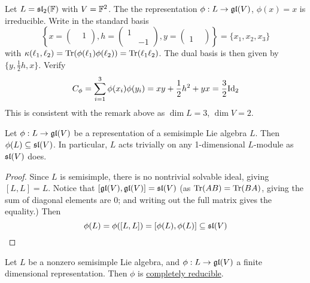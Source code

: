 \documentclass{article}
\begin{document}
\begin{example}
    Let $L = \mathfrak{sl}_2(\mathbb{F})$ with $V = \mathbb{F}^2$. The the representation $\phi: L \to \mathfrak{gl}(V)$, $\phi(x) = x$ is irreducible. Write in the standard basis
    \[
        \left\{ 
        x = \begin{pmatrix}
            & 1 \\ &     
        \end{pmatrix}, 
        h = \begin{pmatrix}
            1 & \\ & -1
        \end{pmatrix},
        y = \begin{pmatrix}
            & \\ 1 &
        \end{pmatrix}
        \right\}
         = \{ x_1, x_2, x_3 \}
    \]
    with $\kappa(\ell_1, \ell_2) = \operatorname{Tr}(\phi(\ell_1)\phi(\ell_2)) = \operatorname{Tr}(\ell_1 \ell_2)$. The dual basis is then given by $\{ y, \frac{1}{2}h, x \}$. Verify
    \[
        C_{\phi} = \sum_{i=1}^3 \phi(x_i) \phi(y_i) = xy + \frac{1}{2} h^2 + yx = \frac{3}{2} \mathrm{Id}_2
    \]
    This is consistent with the remark above as $\dim L = 3$, $\dim V = 2$.
\end{example}

\begin{lemma}\label{lem: semisimple repr acts trivially on 1-dim repr}
    Let $\phi: L \to \mathfrak{gl}(V)$ be a representation of a semisimple Lie algebra $L$. Then $\phi(L) \subseteq \mathfrak{sl}(V)$. In particular, $L$ acts trivially on any 1-dimensional $L$-module as $\mathfrak{sl}(V)$ does.
\end{lemma}

\begin{proof}
    Since $L$ is semisimple, there is no nontrivial solvable ideal, giving $[L, L] = L$. Notice that $[\mathfrak{gl}(V), \mathfrak{gl}(V)] = \mathfrak{sl}(V)$ (as $\operatorname{Tr}(AB) = \operatorname{Tr}(BA)$, giving the sum of diagonal elements are 0; and writing out the full matrix gives the equality.) Then
    \[
        \phi(L) = \phi([L, L]) = [\phi(L), \phi(L)] \subseteq \mathfrak{sl}(V)
    \]
\end{proof}

\begin{theorem}[Weyl]
    Let $L$ be a nonzero semisimple Lie algebra, and $\phi: L \to \mathfrak{gl}(V)$ a finite dimensional representation. Then $\phi$ is \hyperref[def: completely reducible]{completely reducible}.
\end{theorem}
\end{document}
